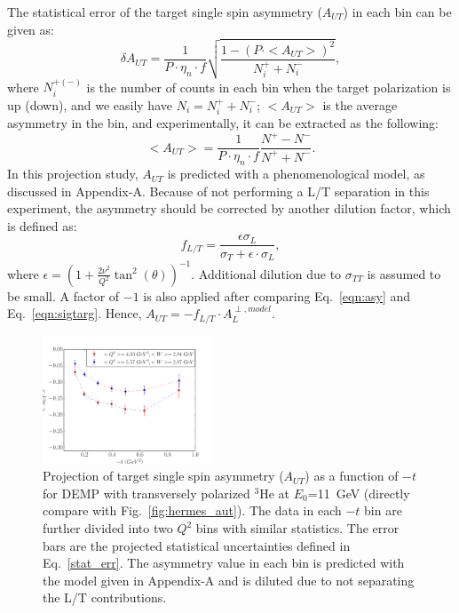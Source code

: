 The statistical error of the target single spin asymmetry ($A_{UT}$) in each
bin can be given as:
  \begin{equation}
    \delta A_{UT} = \frac{1}{P\cdot\eta_{n}\cdot f} \sqrt{\frac{1-(P\cdot
        <A_{UT}>)^{2}}{N^{+}_{i}+N^{-}_{i}}},
    \label{stat_err}
 \end{equation}
where $N^{+(-)}_{i}$ is the number of counts in each bin when the target
polarization is up (down), and we easily have $N_{i}=N^{+}_{i}+N^{-}_{i}$;
$<A_{UT}>$ is the average asymmetry in the bin, and experimentally, it can be
extracted as the following:
\begin{equation}
   <A_{UT}> = \frac{1}{P\cdot\eta_{n}\cdot f} \frac{N^{+}-N^{-}}{N^{+}+N^{-}}.
   \label{asym_exp}
\end{equation}
In this projection study, $A_{UT}$ is predicted with a phenomenological model,
as discussed in Appendix-A. Because of not performing a L/T separation in this
experiment, the asymmetry should be corrected by another dilution factor, which
is defined as:
\begin{equation}
  f_{L/T} =\frac{\epsilon\sigma_{L} }{\sigma_{T}+\epsilon\cdot\sigma_{L} },
\end{equation} 
where $\epsilon=(1+\frac{2\nu^{2}}{Q^{2}}\tan^{2}(\theta))^{-1}$. Additional
dilution due to $\sigma_{TT}$ is assumed to be small.  A factor of $-1$ is also
applied after comparing Eq.~\ref{eqn:asy} and Eq.~\ref{eqn:sigtarg}. Hence,
$A_{UT} = -f_{L/T}\cdot A_{L}^{\perp,model}$.

\begin{figure}[!ht]
 \begin{center}
               \includegraphics[type=pdf,
        ext=.pdf,read=.pdf,width=0.45\textwidth]{./figures/bin_asym_t_fermi} 
      
      \caption{\footnotesize{Projection of target single spin asymmetry
          ($A_{UT}$) as a function of $-t$ for DEMP with transversely polarized
          $\mathrm{^{3}He}$ at $E_{0}$=11~GeV (directly compare with
Fig.~\ref{fig:hermes_aut}).  The data in each $-t$ bin are further divided into
two $Q^{2}$ bins with similar statistics.  The error bars are the projected
statistical uncertainties defined in Eq.~\ref{stat_err}. The asymmetry value in
each bin is predicted with the model given in Appendix-A and is diluted due to
not separating the L/T contributions. }}
  \label{asym_t}
  \end{center}
\end{figure}

